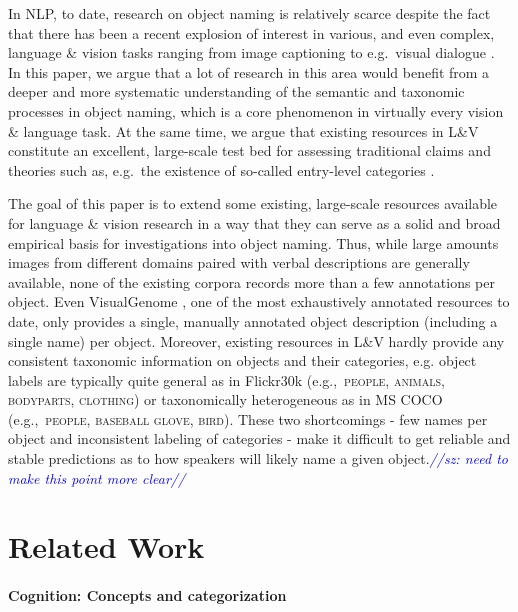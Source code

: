 \documentclass[11pt]{article}
\newcommand{\sz}[1]{\textcolor{blue}{\emph{//sz: #1//}}}
\newcommand{\cat}[1]{\textsc{#1}}
\begin{document}
In NLP, to date, research on object naming is relatively scarce despite the fact that
 there has been a recent explosion of interest in various, and even complex, language \& vision tasks ranging from image captioning \cite{fangetal:2015,devlin:imcaqui,Bernardietal:automatic} to e.g.\ visual dialogue \cite{das2017visual,vries2017guesswhat}.
In this paper, we argue that a lot of research in this area would benefit from a deeper and more systematic understanding of the semantic and taxonomic processes in object naming, which is a core phenomenon in virtually every vision \& language task.
At the same time, we argue that existing resources in L\&V constitute an excellent, large-scale test bed for assessing traditional claims and theories such as, e.g.\ the existence of so-called entry-level categories  \cite{rosch1976basic}.

The goal of this paper is to extend some existing, large-scale resources available for language \& vision research in a way that they can serve as a solid and broad empirical basis for investigations into object naming. 
Thus, while large amounts images from different domains paired with verbal descriptions are generally available, none of the existing corpora records more than a few annotations per object.
Even VisualGenome \cite{krishna2016visualgenome}, one of the most exhaustively annotated resources to date, only provides a single, manually annotated object description (including a single name) per object. 
Moreover, existing resources in L\&V hardly provide any consistent taxonomic information on objects and their categories, e.g. object labels are typically quite general as in Flickr30k \cite{plummer2015flickr30kentities} (e.g.,~\cat{people, animals, bodyparts, clothing}) or taxonomically heterogeneous as in MS COCO \cite{mscoco} (e.g.,~\cat{people, baseball glove, bird}).
These two shortcomings - few names per object and inconsistent labeling of categories - make it difficult to get reliable and stable predictions as to how speakers will likely name a given object.\sz{need to make this point more clear}


\section{Related Work}
\label{sec:related}

\paragraph{Cognition: Concepts and categorization}
\end{document}
